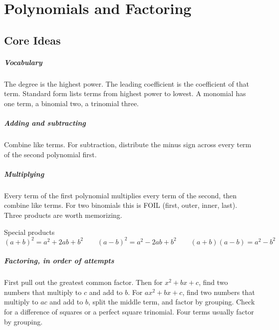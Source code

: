 \chapter{Polynomials and Factoring}


\section{Core Ideas}

\paragraph{Vocabulary} The degree is the highest power. The leading coefficient is the coefficient of that term. Standard form lists terms from highest power to lowest. A monomial has one term, a binomial two, a trinomial three.

\paragraph{Adding and subtracting} Combine like terms. For subtraction, distribute the minus sign across every term of the second polynomial first.

\paragraph{Multiplying} Every term of the first polynomial multiplies every term of the second, then combine like terms. For two binomials this is FOIL (first, outer, inner, last). Three products are worth memorizing.

\begin{keybox}{Special products}
\[
(a + b)^2 = a^2 + 2ab + b^2 \qquad (a - b)^2 = a^2 - 2ab + b^2 \qquad (a + b)(a - b) = a^2 - b^2
\]
\end{keybox}

\paragraph{Factoring, in order of attempts} First pull out the greatest common factor. Then for $x^2 + bx + c$, find two numbers that multiply to $c$ and add to $b$. For $ax^2 + bx + c$, find two numbers that multiply to $ac$ and add to $b$, split the middle term, and factor by grouping. Check for a difference of squares or a perfect square trinomial. Four terms usually factor by grouping.

